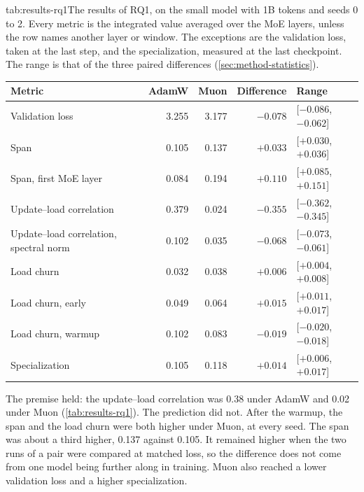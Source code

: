 \begin{table}[The results of RQ1]{tab:results-rq1}{The results of RQ1, on the small model with 1B tokens and seeds 0 to 2. Every metric is the integrated value averaged over the MoE layers, unless the row names another layer or window. The exceptions are the validation loss, taken at the last step, and the specialization, measured at the last checkpoint. The range is that of the three paired differences (\cref{sec:method-statistics}).}
  \begin{tabular}{lrrrl}
    \toprule
    Metric                            & AdamW   & Muon    & Difference  & Range                  \\
    \midrule
    Validation loss                   & 3.255   & 3.177   & $-0.078$    & [$-0.086$, $-0.062$]   \\
    Span                              & 0.105   & 0.137   & $+0.033$    & [$+0.030$, $+0.036$]   \\
    Span, first MoE layer             & 0.084   & 0.194   & $+0.110$    & [$+0.085$, $+0.151$]   \\
    Update--load correlation          & 0.379   & 0.024   & $-0.355$    & [$-0.362$, $-0.345$]   \\
    Update--load correlation, spectral norm & 0.102   & 0.035   & $-0.068$    & [$-0.073$, $-0.061$]   \\
    Load churn                        & 0.032   & 0.038   & $+0.006$    & [$+0.004$, $+0.008$]   \\
    Load churn, early                 & 0.049   & 0.064   & $+0.015$    & [$+0.011$, $+0.017$]   \\
    Load churn, warmup                & 0.102   & 0.083   & $-0.019$    & [$-0.020$, $-0.018$]   \\
    Specialization                    & 0.105   & 0.118   & $+0.014$    & [$+0.006$, $+0.017$]   \\
    \bottomrule
  \end{tabular}
\end{table}

The premise held: the update--load correlation was 0.38 under AdamW and 0.02 under Muon (\cref{tab:results-rq1}). The prediction did not. After the warmup, the span and the load churn were both higher under Muon, at every seed. The span was about a third higher, 0.137 against 0.105. It remained higher when the two runs of a pair were compared at matched loss, so the difference does not come from one model being further along in training. Muon also reached a lower validation loss and a higher specialization.


